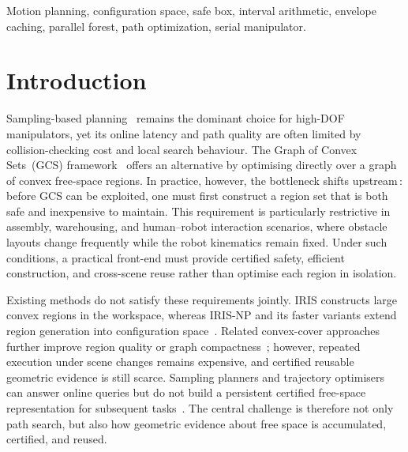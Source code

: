 \documentclass[journal]{IEEEtran}
\begin{document}
\begin{IEEEkeywords}
Motion planning, configuration space, safe box, interval arithmetic,
envelope caching, parallel forest, path optimization, serial manipulator.
\end{IEEEkeywords}

\section{Introduction}\label{sec:intro}

Sampling-based planning~\cite{lavalle2006planning,lavalle1998rapidly,%
kavraki1996probabilistic} remains the dominant choice for high-DOF
manipulators, yet its online latency and path quality are often limited
by collision-checking cost and local search behaviour.
The Graph of Convex Sets~(GCS) framework~\cite{marcucci2024motion}
offers an alternative by optimising directly over a graph of convex
free-space regions.
In practice, however, the bottleneck shifts upstream\,\cite{deits2015computing,werner2024fast}: before GCS can be
exploited, one must first construct a region set that is both safe and
inexpensive to maintain.
This requirement is particularly restrictive in assembly, warehousing,
and human--robot interaction scenarios, where obstacle layouts change
frequently while the robot kinematics remain fixed.
Under such conditions, a practical front-end must provide certified
safety, efficient construction, and cross-scene reuse rather than
optimise each region in isolation.

Existing methods do not satisfy these requirements jointly.
IRIS constructs large convex regions in the workspace, whereas IRIS-NP
and its faster variants extend region generation into configuration
space~\cite{deits2015computing,werner2024fast,werner2024irisze}.
Related convex-cover approaches further improve region quality or graph
compactness~\cite{amice2024clique,werner2024vcd}; however, repeated
execution under scene changes remains expensive, and certified reusable
geometric evidence is still scarce.
Sampling planners and trajectory optimisers can answer online queries
but do not build a persistent certified free-space representation for
subsequent tasks~\cite{lavalle1998rapidly,kuffner2000rrt,
gammell2020batch,ratliff2009chomp,schulman2014motion,
toussaint2017newton}.
The central challenge is therefore not only path search, but also how
geometric evidence about free space is accumulated, certified, and
reused.
\end{document}
